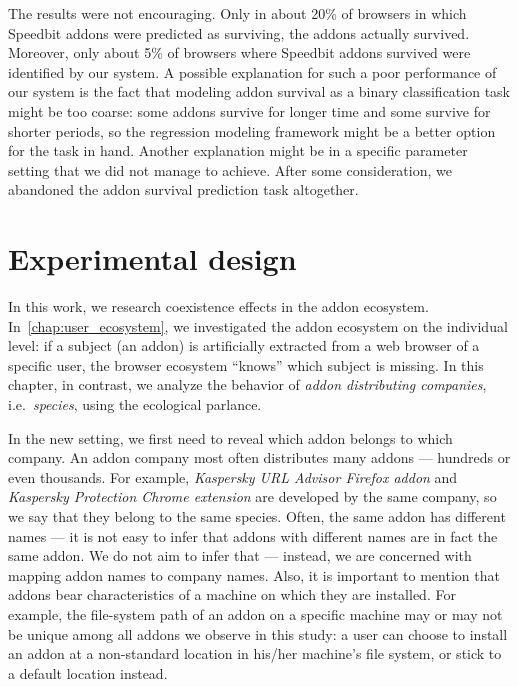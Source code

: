 \documentclass[11pt,oneside]{book}
\let\Oldsection\section
\renewcommand{\section}{\FloatBarrier\Oldsection}
\begin{document}
The results were not encouraging. Only in about 20\% of browsers in which Speedbit addons were predicted as surviving, the addons actually survived. Moreover, only about 5\% of browsers where Speedbit addons survived were identified by our system. A possible explanation for such a poor performance of our system is the fact that modeling addon survival as a binary classification task might be too coarse: some addons survive for longer time and some survive for shorter periods, so the regression modeling framework might be a better option for the task in hand. Another explanation might be in a specific parameter setting that we did not manage to achieve. After some consideration, we abandoned the addon survival prediction task altogether.

\section{Experimental design}
\label{sec:experiment_des}

In this work, we research coexistence effects in the addon ecosystem. In~\autoref{chap:user_ecosystem}, we investigated the addon ecosystem on the individual level: if a subject (an addon) is artificially extracted from a web browser of a specific user, the browser ecosystem ``knows'' which subject is missing. In this chapter, in contrast, we analyze the behavior of \emph{addon distributing companies}, i.e.~\emph{species}, using the ecological parlance. 

In the new setting, we first need to reveal which addon belongs to which company. An addon company most often distributes many addons --- hundreds or even thousands. For example, \emph{Kaspersky URL Advisor Firefox addon} and \emph{Kaspersky Protection Chrome extension} are developed by the same company, so we say that they belong to the same species. Often, the same addon has different names --- it is not easy to infer that addons with different names are in fact the same addon. We do not aim to infer that --- instead, we are concerned with mapping addon names to company names. Also, it is important to mention that addons bear characteristics of a machine on which they are installed. For example, the file-system path of an addon on a specific machine may or may not be unique among all addons we observe in this study: a user can choose to install an addon at a non-standard location in his/her machine's file system, or stick to a default location instead.
\end{document}

